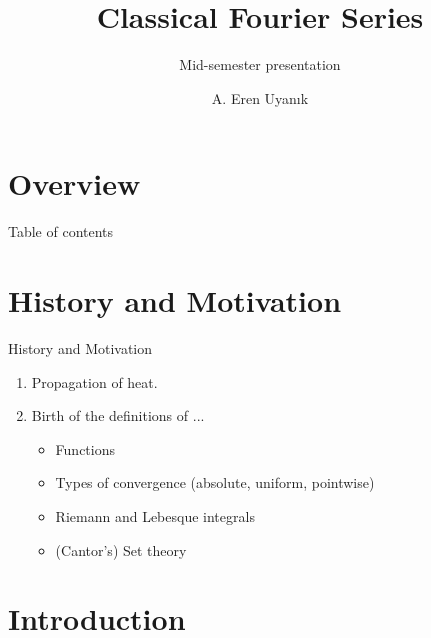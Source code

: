 \documentclass{beamer}
\author{A. Eren Uyanık}
\title{Classical Fourier Series}
\subtitle{Mid-semester presentation}
\begin{document}
\begin{frame}[plain]
  \titlepage
\end{frame}






\section{Overview}


%
%
\begin{frame}{Table of contents}
    \tableofcontents[currentsection]
\end{frame}


\section{History and Motivation}



\begin{frame}{History and Motivation}
\small
\begin{enumerate}
    \item Propagation of heat. 
    \item Birth of the definitions of ...
    \begin{itemize}
        \item Functions
        \item Types of convergence (absolute, uniform, pointwise)
        \item Riemann and Lebesque integrals
        \item (Cantor's) Set theory
    \end{itemize}
\end{enumerate}
\end{frame}




\section{Introduction}
\end{document}
